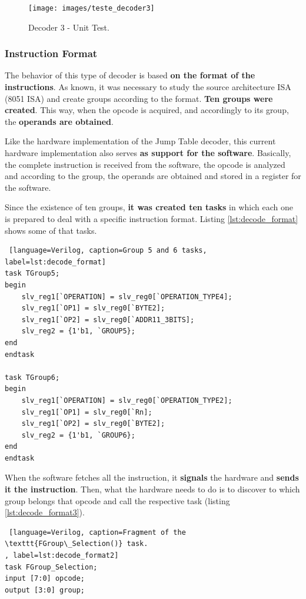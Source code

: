 \documentclass[12pt]{article}
\newcounter{subsubsubsection}[subsubsection]
\begin{document}
{\begin{figure}[H]
\centerline{
\texttt{[image: images/teste\_decoder3]}
}
\caption{Decoder 3 - Unit Test.}
\label{fig:teste1_decoder3} 
\end{figure}


\subsubsection{Instruction Format}

The behavior of this type of decoder is based \textbf{on the format of the instructions}. As known, it was necessary to study the source architecture ISA (8051 ISA) and create groups according to the format. \textbf{Ten groups were created}. This way, when the opcode is acquired, and accordingly to its group, the \textbf{operands are obtained}. 


Like the hardware implementation of the Jump Table decoder, this current hardware implementation also serves \textbf{as support for the software}. Basically, the complete instruction is received from the software, the opcode is analyzed and according to the group, the operands are obtained and stored in a register for the software.

Since the existence of ten groups, \textbf{it was created ten tasks} in which each one is prepared to deal with a specific instruction format. Listing \ref{lst:decode_format} shows some of that tasks.

\begin{lstlisting} [language=Verilog, caption=Group 5 and 6 tasks, label=lst:decode_format]
task TGroup5;
begin
    slv_reg1[`OPERATION] = slv_reg0[`OPERATION_TYPE4];
    slv_reg1[`OP1] = slv_reg0[`BYTE2];
    slv_reg1[`OP2] = slv_reg0[`ADDR11_3BITS];
    slv_reg2 = {1'b1, `GROUP5};
end
endtask
    
task TGroup6;
begin
    slv_reg1[`OPERATION] = slv_reg0[`OPERATION_TYPE2];
    slv_reg1[`OP1] = slv_reg0[`Rn];
    slv_reg1[`OP2] = slv_reg0[`BYTE2];
    slv_reg2 = {1'b1, `GROUP6};
end
endtask
\end{lstlisting}

When the software fetches all the instruction, it \textbf{signals} the hardware and \textbf{sends it the instruction}. Then, what the hardware needs to do is to discover to which group belongs that opcode and call the respective task (listing \ref{lst:decode_format3}). 

\begin{lstlisting} [language=Verilog, caption=Fragment of the \texttt{FGroup\_Selection()} task.
, label=lst:decode_format2]
task FGroup_Selection;
input [7:0] opcode;
output [3:0] group;
  

\end{lstlisting}}
\end{document}
